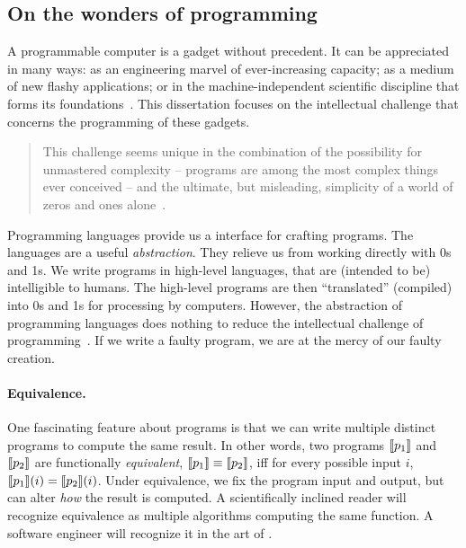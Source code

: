 \subsection{On the wonders of programming}
\label{subsec:programming-wonders}

A programmable computer is a gadget without precedent. It can be appreciated in
many ways: as an engineering marvel of ever-increasing capacity; as a medium of
new flashy applications; or in the machine-independent scientific discipline
that forms its foundations~\cite{dijkstra1979a,hoare2006}. This dissertation
focuses on the intellectual challenge that concerns the {programming} of these
gadgets.

\begin{quotation}
\noindent This challenge seems unique in the combination of the possibility for
unmastered complexity -- programs are among the most complex things ever
conceived -- and the ultimate, but misleading, simplicity of a world of zeros
and ones alone~\cite{dijkstra1979a}.
\end{quotation}

Programming languages provide us a interface for crafting programs. The
languages are a useful \emph{abstraction}. They relieve us from working directly
with 0s and 1s. We write programs in {high-level} languages, that are (intended
to be) intelligible to humans. The high-level programs are then
\enquote{translated} (compiled) into 0s and 1s for processing by computers.
However, the abstraction of programming languages does nothing to reduce the
intellectual challenge of programming~\cite{dijkstra1979b}. If we write a faulty
program, we are at the mercy of our faulty creation.

\paragraph{Equivalence.}
One fascinating feature about programs is that we can write multiple distinct
programs to compute the same result. In other words, two programs
$\llbracket p_1\rrbracket$ and $\llbracket p_2\rrbracket$ are functionally
\emph{equivalent}, \ie \(\llbracket p_1\rrbracket \equiv
\llbracket p_2\rrbracket\), iff for every possible input \(i\), \(\llbracket p_1\rrbracket(i) =
\llbracket p_2\rrbracket(i)\). Under equivalence, we fix the program input and
output, but can alter \emph{how} the result is computed. A scientifically
inclined reader will recognize equivalence as multiple algorithms computing the
same function. A software engineer will recognize it in the art of
.

